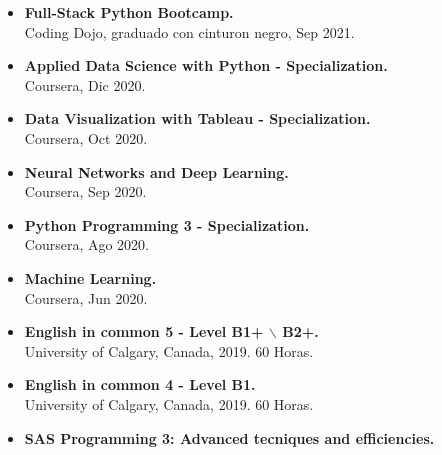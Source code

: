 \documentclass[10pt,a4paper,ragged2e,withhyper,academicons]{altacv}
\begin{document}
\begin{paracol}{2}
\bigskip
\medskip


\begin{itemize}
	\item \textbf{Full-Stack Python Bootcamp.} \\
	Coding Dojo, graduado con cinturon negro, Sep 2021.
	\item \textbf{Applied Data Science with Python - Specialization.} \\
	Coursera, Dic 2020.
	\item \textbf{Data Visualization with Tableau - Specialization.}\\
	Coursera, Oct 2020.	
	\item \textbf{Neural Networks and Deep Learning.}\\
	Coursera, Sep 2020.
	\item \textbf{Python Programming 3 - Specialization.}\\
	Coursera, Ago 2020. %
	\item \textbf{Machine Learning.}\\ 
	Coursera, Jun 2020. %
	\item \textbf{English in common 5 - Level B1+ $\backslash$ B2+.} \\
	University of Calgary, Canada, 2019. 60 Horas.
	\item \textbf{English in common 4 - Level B1.} \\
	University of Calgary, Canada, 2019. 60 Horas.
	\item \textbf{SAS Programming 3: Advanced tecniques and efficiencies.}\\ 

\end{itemize}
\end{paracol}
\end{document}
